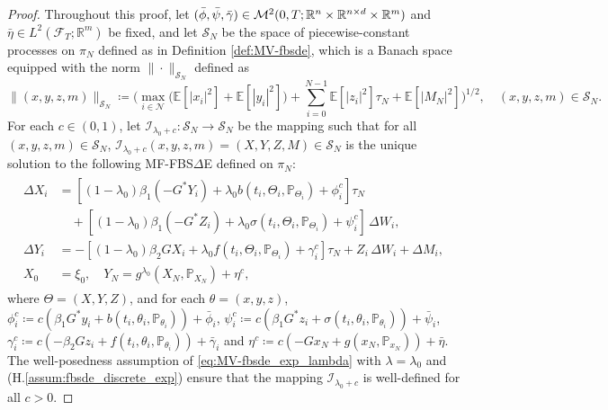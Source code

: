 \documentclass[11pt]{article}
\numberwithin{equation}{section}
\theoremstyle{definition}
\theoremstyle{remark}
\def\to{\rightarrow}
\newcommand{\q}{\quad}   \newcommand{\qq}{\qquad}
\def\b{\beta}  \def\a{\alpha} \def\ga{\gamma}
\def\cF{\mathcal{F}}
\def\cI{\mathcal{I}}
\def\cM{\mathcal{M}}
\def\cN{\mathcal{N}}
\def\cS{\mathcal{S}}
\def\sE{{\mathbb{E}}}
\def\sP{\mathbb{P}}
\def\sR{{\mathbb R}}
\newcommand{\fbsde}{FBS$\Delta$E }
\begin{document}
\begin{proof}
Throughout this proof,
let $(\bar{\phi},\bar{\psi},\bar{\gamma})\in \cM^2(0,T; \sR^n\t \sR^{n\t d}\t \sR^m)$ and  $\bar{\eta}\in L^2(\cF_T;\sR^m)$
 be fixed, 
and let $\cS_N$ be the space of  piecewise-constant processes on $\pi_N$ defined as in 
Definition \ref{def:MV-fbsde},
which is a Banach space equipped with  the norm $\|\cdot\|_{\cS_N}$ defined as
$$
\|(x,y,z,m)\|_{\cS_N}\coloneqq
\bigg(\max_{i\in \cN}\big(\sE[|x_i|^2]+\sE[|y_i|^2]\big)+\sum_{i=0}^{N-1}\sE[|z_i|^2]\tau_N+\sE[|M_N|^2]\bigg)^{1/2},
\q (x,y,z,m)\in \cS_N.
$$
For each $c\in (0,1)$, let $\cI_{\lambda_0+c}:\cS_N\to \cS_N$ 
be the mapping 
such that for all $(x,y,z,m)\in \cS_N$,
$\cI_{\lambda_0+c}(x,y,z,m)=(X,Y,Z,M)\in \cS_N$ is the unique solution to the following MF-\fbsde defined on $\pi_N$:
\begin{align}%
\begin{split}
\Delta X_i&=
[(1-\lambda_0)\b_1 (-G^*Y_{i})+\lambda_0 b(t_{i},\Theta_{i},\sP_{\Theta_{i}})
+\phi^c_{i}]\tau_N  
\\
&\quad
+[
(1-\lambda_0)\b_1 (-G^*Z_{i})+\lambda_0 \sigma(t_{i},\Theta_{i},\sP_{\Theta_{i}})
+\psi^c_i] \, \Delta W_i, 
\\
\Delta Y_i&=-[
(1-\lambda_0)\b_2GX_i+\lambda_0 f(t_{i},\Theta_{i}, \sP_{\Theta_{i}})
+\gamma^c_i]\tau_N+Z_i\,\Delta W_i+\Delta M_i,
\\
X_0&=\xi_0,\q Y_N= g^{\lambda_0}(X_N,\sP_{X_N})+\eta^c,
\end{split}
\end{align}
where  $\Theta=(X,Y,Z)$, 
and for each $\theta=(x,y,z)$,
$\phi^c_{i}\coloneqq c (\b_1 G^*y_{i}+ b(t_{i},\theta_{i},\sP_{\theta_{i}}))+\bar{\phi}_{i}$,
$\psi^c_i \coloneqq c (\b_1 G^*z_{i}+ \sigma (t_{i},\theta_{i},\sP_{\theta_{i}}))+\bar{\psi}_{i}$,
$\gamma^c_i\coloneqq c (-\b_2 G z_{i}+ f (t_{i},\theta_{i},\sP_{\theta_{i}}))+\bar{\gamma}_i$
and $\eta^c \coloneqq c (-Gx_N+g(x_N,\sP_{x_N}))+\bar{\eta}$.
The well-posedness assumption of 
\eqref{eq:MV-fbsde_exp_lambda} with $\lambda=\lambda_0$
and (H.\ref{assum:fbsde_discrete_exp})
 ensure that the mapping $\cI_{\lambda_0+c}$ is well-defined for all $c>0$.


\end{proof}
\end{document}
